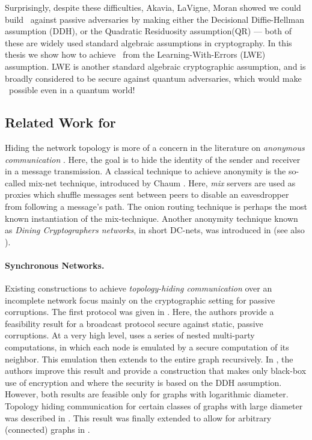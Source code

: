 Surprisingly, despite these difficulties, Akavia, LaVigne, Moran \cite{C:AkaLaVMor17} showed we could build \THC~against passive adversaries by making either the Decisional Diffie-Hellman assumption (DDH), or the Quadratic Residuosity assumption(QR) --- both of these are widely used standard algebraic assumptions in cryptography. In this thesis we show how to achieve \THC~from the Learning-With-Errors (LWE) assumption. LWE is another standard algebraic cryptographic assumption, and is broadly considered to be secure against quantum adversaries, which would make \THC~possible even in a quantum world!

\subsection{Related Work for \THC}
Hiding the network topology is more of a concern in the literature on \emph{anonymous communication} \cite{ACM:Cha81,ACM:RR98,IEEE:SGR97}. Here, the goal is to hide the identity of the sender and receiver in a message transmission. A classical technique to achieve anonymity is the so-called mix-net technique, introduced by Chaum \cite{ACM:Cha81}. Here, \emph{mix} servers are used as proxies which shuffle messages sent between peers to disable an eavesdropper from following a message's path. The onion routing technique \cite{IEEE:SGR97,ACM:RR98} is perhaps the most known instantiation of the mix-technique. %
Another anonymity technique known as \emph{Dining Cryptographers networks}, in short DC-nets, was introduced in \cite{JC:Chaum88} (see also \cite{EC:BosDen89,EC:GolJue04}). 

\paragraph{Synchronous Networks.} Existing constructions to achieve \emph{topology-hiding communication} over an incomplete network focus mainly on the cryptographic setting for passive corruptions. The first protocol was given in \cite{TCC:MorOrlRic15}. Here, the authors provide a feasibility result for a broadcast protocol secure against static, passive corruptions. At a very high level, \cite{TCC:MorOrlRic15} uses a series of nested multi-party computations, in which each node is emulated by a secure computation of its neighbor. This emulation then extends to the entire graph recursively. In \cite{C:HMTZ16}, the authors improve this result and provide a construction that makes only black-box use of encryption and where the security is based on the DDH assumption. However, both results are feasible only for graphs with logarithmic diameter. 
Topology hiding communication for certain classes of graphs with large diameter was described in \cite{EC:AkaMor17}. This result was finally extended to allow for arbitrary (connected) graphs in \cite{C:AkaLaVMor17}.

